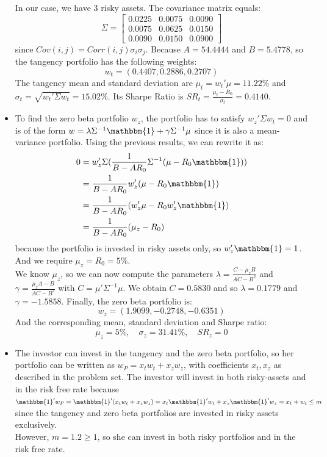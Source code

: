 \documentclass[10pt]{article}
\newenvironment{exercise}[2][Exercise]{\begin{trivlist}
  \item[\hskip \labelsep {\bfseries #1}\hskip \labelsep {\bfseries #2.}]}{\end{trivlist}}
\begin{document}
\begin{exercise}{1}
\begin{itemize}
    In our case, we have $3$ risky assets. The covariance matrix equals:
    $$ \Sigma = \left[ {\begin{array}{ccc}
      0.0225  &  0.0075  &  0.0090\\
      0.0075  &  0.0625  &  0.0150\\
      0.0090  &  0.0150  &  0.0900
    \end{array} } \right]$$ since $Cov(i,j) = Corr(i,j)\sigma_i\sigma_j$. Because $A = 54.4444$ and $B = 5.4778$, so the tangency portfolio has the following weights: $$ w_t = (0.4407, 0.2886, 0.2707)$$ 
    The tangency mean and standard deviation are $\mu_t = w_t'\mu = 11.22\%$ and $\sigma_t = \sqrt{w_t'\Sigma w_t} = 15.02\%$. Its Sharpe Ratio is $SR_t = \frac{\mu_t - R_0}{\sigma_t} = 0.4140$. 
    \item To find the zero beta portfolio $w_z$, the portfolio has to satisfy $w_z'\Sigma w_t = 0$ and is of the form $w = \lambda\Sigma^{-1}\mathbbm{1}+ \gamma\Sigma^{-1}\mu$ since it is also a mean-variance portfolio. Using the previous results, we can rewrite it as:
    \begin{align*}
      0 &= w_z'\Sigma(\frac{1}{B-AR_0}\Sigma^{-1}(\mu-R_0\mathbbm{1})) \\
      &= \frac{1}{B-AR_0}w_z'(\mu-R_0\mathbbm{1}) \\
      &= \frac{1}{B-AR_0}(w_z'\mu - R_0w_z'\mathbbm{1}) \\
      &= \frac{1}{B-AR_0}(\mu_z - R_0)
    \end{align*} because the portfolio is invested in risky assets only, so $w_z'\mathbbm{1} = 1$. And we require $\mu_z = R_0 = 5\%$. 
    \\
    We know $\mu_z$, so we can now compute the parameters $\lambda = \frac{C-\mu_zB}{AC-B^2}$ and $\gamma = \frac{\mu_zA-B}{AC-B^2}$ with $C = \mu'\Sigma^{-1}\mu$. 
    We obtain $C = 0.5830$ and so $\lambda= 0.1779$ and $\gamma = -1.5858$. 
    Finally, the zero beta portfolio is: 
    $$ w_z = (1.9099, -0.2748, -0.6351)$$
    And the corresponding mean, standard deviation and Sharpe ratio: 
    $$ \mu_z = 5\%, \quad \sigma_z = 31.41\%, \quad SR_z = 0$$
    \item The investor can invest in the tangency and the zero beta portfolio, so her portfolio can be written as $w_P = x_tw_t + x_zw_z$, with coefficients $x_t,x_z$ as described in the problem set. The investor will invest in both risky-assets and in the risk free rate because $\mathbbm{1}'w_P = \mathbbm{1}'(x_tw_t+x_zw_z) = x_t\mathbbm{1}'w_t + x_z\mathbbm{1}'w_z = x_t + w_t \leq m$ since the tangency and zero beta portfolios are invested in risky assets exclusively. 
    \\ However, $m =1.2\geq 1$, so she can invest in both risky portfolios and in the risk free rate.  


\end{itemize}
\end{exercise}
\end{document}
